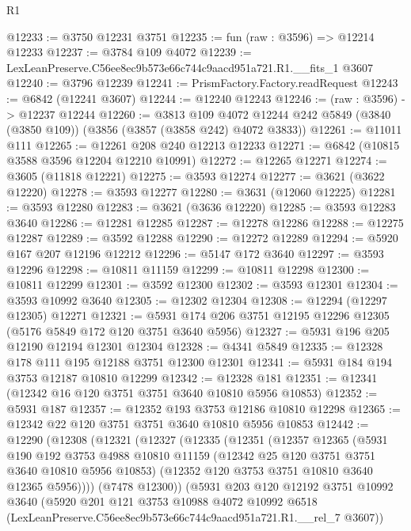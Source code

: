 \begin{lexlean}{R1}
\begin{coremodule}
@12233 := @3750 @12231 @3751
@12235 := fun (raw : @3596) => @12214 @12233
@12237 := @3784 @109 @4072
@12239 := LexLeanPreserve.C56ee8ec9b573e66c744c9aacd951a721.R1.__fits_1 @3607
@12240 := @3796 @12239
@12241 := PrismFactory.Factory.readRequest
@12243 := @6842 (@12241 @3607)
@12244 := @12240 @12243
@12246 := (raw : @3596) -> @12237 @12244
@12260 := @3813
    @109
    @4072
    @12244
    @242
    @5849
    (@3840 (@3850 @109))
    (@3856 (@3857 (@3858 @242) @4072 @3833))
@12261 := @11011 @111
@12265 := @12261 @208 @240 @12213 @12233
@12271 := @6842 (@10815 @3588 @3596 @12204 @12210 @10991)
@12272 := @12265 @12271
@12274 := @3605 (@11818 @12221)
@12275 := @3593 @12274
@12277 := @3621 (@3622 @12220)
@12278 := @3593 @12277
@12280 := @3631 (@12060 @12225)
@12281 := @3593 @12280
@12283 := @3621 (@3636 @12220)
@12285 := @3593 @12283 @3640
@12286 := @12281 @12285
@12287 := @12278 @12286
@12288 := @12275 @12287
@12289 := @3592 @12288
@12290 := @12272 @12289
@12294 := @5920 @167 @207 @12196 @12212
@12296 := @5147 @172 @3640
@12297 := @3593 @12296
@12298 := @10811 @11159
@12299 := @10811 @12298
@12300 := @10811 @12299
@12301 := @3592 @12300
@12302 := @3593 @12301
@12304 := @3593 @10992 @3640
@12305 := @12302 @12304
@12308 := @12294 (@12297 @12305) @12271
@12321 := @5931 @174 @206 @3751 @12195 @12296 @12305 (@5176 @5849 @172 @120 @3751 @3640 @5956)
@12327 := @5931 @196 @205 @12190 @12194 @12301 @12304
@12328 := @4341 @5849
@12335 := @12328 @178 @111 @195 @12188 @3751 @12300 @12301
@12341 := @5931 @184 @194 @3753 @12187 @10810 @12299
@12342 := @12328 @181
@12351 := @12341 (@12342 @16 @120 @3751 @3751 @3640 @10810 @5956 @10853)
@12352 := @5931 @187
@12357 := @12352 @193 @3753 @12186 @10810 @12298
@12365 := @12342 @22 @120 @3751 @3751 @3640 @10810 @5956 @10853
@12442 := @12290
    (@12308
      (@12321
        (@12327
          (@12335
            (@12351
              (@12357
                @12365
                (@5931
                  @190
                  @192
                  @3753
                  @4988
                  @10810
                  @11159
                  (@12342 @25 @120 @3751 @3751 @3640 @10810 @5956 @10853)
                  (@12352 @120 @3753 @3751 @10810 @3640 @12365 @5956))))
            (@7478 @12300))
          (@5931
            @203
            @120
            @12192
            @3751
            @10992
            @3640
            (@5920
              @201
              @121
              @3753
              @10988
              @4072
              @10992
              @6518
              (LexLeanPreserve.C56ee8ec9b573e66c744c9aacd951a721.R1.__rel_7 @3607))

\end{coremodule}
\end{lexlean}
